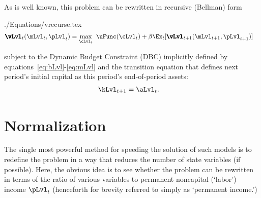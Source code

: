 \documentclass[titlepage, headings=optiontotocandhead]{\econtex}
\begin{document}
As is well known, this problem can be rewritten in recursive (Bellman) form
\begin{verbatimwrite}{./Equations/vrecurse.tex}
  \begin{equation}\begin{gathered}\begin{aligned}
        {\pmb{\vLvl}}
_{t}(\mLvl_{t},\pLvl_{t})  & = \max_{\cLvl_{t}}~ \uFunc(\cLvl_{t}) + {\DiscAlt}\Ex_{t}[ {\pmb{\vLvl}}
_{t+1}({\mLvl}_{t+1},\pLvl_{t+1})]\label{eq:vrecurse}
      \end{aligned}\end{gathered}\end{equation}
\end{verbatimwrite}
\unskip
subject to the Dynamic Budget Constraint (DBC) implicitly defined by equations~\eqref{eq:bLvl}-\eqref{eq:mLvl}
and the transition equation that defines next period's initial capital as this period's end-of-period assets:
\begin{equation}\begin{gathered}\begin{aligned}
      \kLvl_{t+1} & = \aLvl_{t}. \label{eq:transition.state}
\end{aligned}\end{gathered}\end{equation}

\hypertarget{Normalization}{}
\section{Normalization}\label{sec:normalization}
 The single most powerful method for speeding the solution of such models is to redefine the problem in a way that reduces the number of state variables (if possible).  Here, the obvious idea is to see whether the problem can be rewritten in terms of the ratio of various variables to permanent noncapital (`labor') income $\pLvl_{t}$ (henceforth for brevity referred to simply as `permanent income.')
\end{document}
